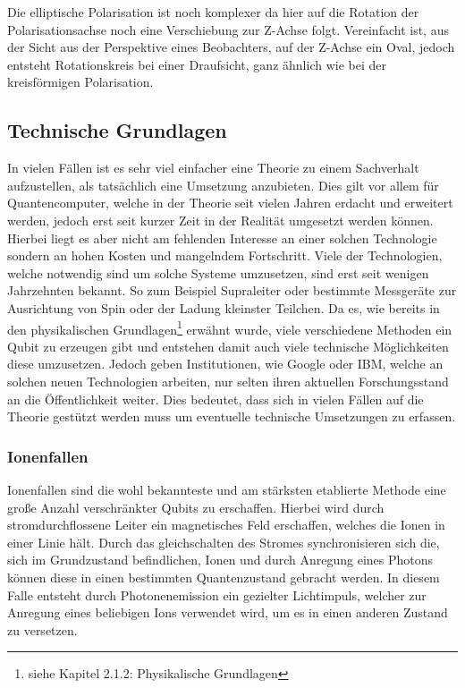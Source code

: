\documentclass[12pt]{report}
\begin{document}
Die elliptische Polarisation ist noch komplexer da hier auf die Rotation der Polarisationsachse noch eine Verschiebung zur Z-Achse folgt. Vereinfacht ist, aus der Sicht aus der Perspektive eines Beobachters, auf der Z-Achse ein Oval, jedoch entsteht Rotationskreis bei einer Draufsicht, ganz ähnlich wie bei der kreisförmigen Polarisation.


	\subsection{Technische Grundlagen}
	In vielen Fällen ist es sehr viel einfacher eine Theorie zu einem Sachverhalt aufzustellen, als tatsächlich eine Umsetzung anzubieten. Dies gilt vor allem für Quantencomputer, welche in der Theorie seit vielen Jahren erdacht und erweitert werden, jedoch erst seit kurzer Zeit in der Realität umgesetzt werden können. Hierbei liegt es aber nicht am fehlenden Interesse an einer solchen Technologie sondern an hohen Kosten und mangelndem Fortschritt. Viele der Technologien, welche notwendig sind um solche Systeme umzusetzen, sind erst seit wenigen Jahrzehnten bekannt. So zum Beispiel Supraleiter oder bestimmte Messgeräte zur Ausrichtung von Spin oder der Ladung kleinster Teilchen.
\newline
Da es, wie bereits in den physikalischen Grundlagen\footnote{siehe Kapitel 2.1.2: Physikalische Grundlagen} erwähnt wurde, viele verschiedene Methoden ein Qubit zu erzeugen gibt und entstehen damit auch viele technische Möglichkeiten diese umzusetzen. Jedoch geben Institutionen, wie Google oder IBM, welche an solchen neuen Technologien arbeiten, nur selten ihren aktuellen Forschungsstand an die Öffentlichkeit weiter. Dies bedeutet, dass sich in vielen Fällen auf die Theorie gestützt werden muss um eventuelle technische Umsetzungen zu erfassen.
\newpage
\subsubsection{Ionenfallen}%

Ionenfallen sind die wohl bekannteste und am stärksten etablierte Methode eine große Anzahl verschränkter Qubits zu erschaffen. Hierbei wird durch stromdurchflossene Leiter ein magnetisches Feld erschaffen, welches die Ionen in einer Linie hält. Durch das gleichschalten des Stromes synchronisieren sich die, sich im Grundzustand befindlichen, Ionen und durch Anregung eines Photons können diese in einen bestimmten Quantenzustand gebracht werden. In diesem Falle entsteht durch Photonenemission ein gezielter Lichtimpuls, welcher zur Anregung eines beliebigen Ions verwendet wird, um es in einen anderen Zustand zu versetzen. 
\end{document}
